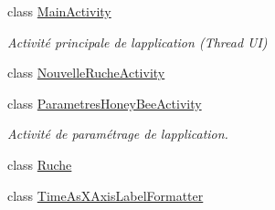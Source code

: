 \begin{DoxyCompactItemize}
class \hyperlink{classfr_1_1campus_1_1laurainc_1_1honeybee_1_1_main_activity}{Main\+Activity}
\begin{DoxyCompactList}\small\item\em Activité principale de l\textquotesingle{}application (Thread UI) \end{DoxyCompactList}\item 
class \hyperlink{classfr_1_1campus_1_1laurainc_1_1honeybee_1_1_nouvelle_ruche_activity}{Nouvelle\+Ruche\+Activity}
\item 
class \hyperlink{classfr_1_1campus_1_1laurainc_1_1honeybee_1_1_parametres_honey_bee_activity}{Parametres\+Honey\+Bee\+Activity}
\begin{DoxyCompactList}\small\item\em Activité de paramétrage de l\textquotesingle{}application. \end{DoxyCompactList}\item 
class \hyperlink{classfr_1_1campus_1_1laurainc_1_1honeybee_1_1_ruche}{Ruche}
\item 
class \hyperlink{classfr_1_1campus_1_1laurainc_1_1honeybee_1_1_time_as_x_axis_label_formatter}{Time\+As\+X\+Axis\+Label\+Formatter}
\end{DoxyCompactItemize}

